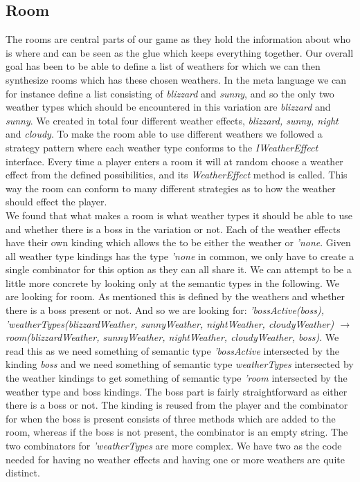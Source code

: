 \subsection{Room}\label{Room}
The rooms are central parts of our game as they hold the information about who is where and can be seen as the glue which keeps everything together. Our overall goal has been to be able to define a list of weathers for which we can then synthesize rooms which has these chosen weathers. In the meta language we can for instance define a list consisting of \textit{blizzard} and \textit{sunny}, and so the only two weather types which should be encountered in this variation are \textit{blizzard} and \textit{sunny}. We created in total four different weather effects, \textit{blizzard, sunny, night} and \textit{cloudy}. To make the room able to use different weathers we followed a strategy pattern where each weather type conforms to the \textit{IWeatherEffect} interface. Every time a player enters a room it will at random choose a weather effect from the defined possibilities, and its \textit{WeatherEffect} method is called. This way the room can conform to many different strategies as to how the weather should effect the player. \\
We found that what makes a room is what weather types it should be able to use and whether there is a boss in the variation or not. Each of the weather effects have their own kinding which allows the to be either the weather or \textit{'none}. Given all weather type kindings has the type \textit{'none} in common, we only have to create a single combinator for this option as they can all share it. We can attempt to be a little more concrete by looking only at the semantic types in the following. We are looking for room. As mentioned this is defined by the weathers and whether there is a boss present or not. And so we are looking for: \textit{'bossActive(boss), 'weatherTypes(blizzardWeather, sunnyWeather, nightWeather, cloudyWeather) $\to$ room(blizzardWeather, sunnyWeather, nightWeather, cloudyWeather, boss)}. We read this as we need something of semantic type \textit{'bossActive} intersected by the kinding \textit{boss} and we need something of semantic type \textit{weatherTypes} intersected by the weather kindings to get something of semantic type \textit{'room} intersected by the weather type and boss kindings. The boss part is fairly straightforward as either there is a boss or not. The kinding is reused from the player and the combinator for when the boss is present consists of three methods which are added to the room, whereas if the boss is not present, the combinator is an empty string. The two combinators for \textit{'weatherTypes} are more complex. We have two as the code needed for having no weather effects and having one or more weathers are quite distinct.

